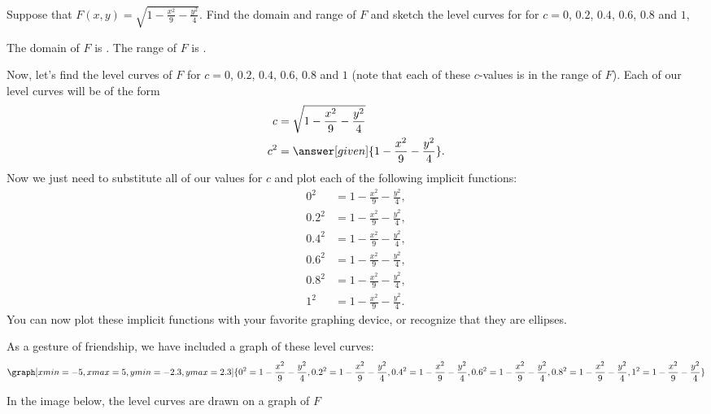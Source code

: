 \documentclass{ximera}
\begin{document}
\begin{example}
  Suppose that $F(x,y) = \sqrt{1-\frac{x^2}{9}-\frac{y^2}{4}}$.  Find
  the domain and range of $F$ and sketch the level curves for for
  $c=0$, $0.2$, $0.4$, $0.6$, $0.8$ and $1$,
  \begin{explanation}
    The domain of $F$ is
    . 
    The range of $F$ is
    \wordChoice{
      \choice{$\R$}
      \choice{$\R^2$}
      \choice{$[0,\infty)$}
      \choice[correct]{$[0,1]$}
      }.

      Now, let's find the level curves of $F$ for $c=0$, $0.2$, $0.4$,
      $0.6$, $0.8$ and $1$ (note that each of these $c$-values is in
      the range of $F$). Each of our level curves will be of the form
      \begin{align*}
        c &= \sqrt{1-\frac{x^2}{9}-\frac{y^2}{4}}\\
        c^2 &= \answer[given]{1-\frac{x^2}{9}-\frac{y^2}{4}}.
      \end{align*}
      Now we just need to substitute all of our values for $c$ and
      plot each of the following implicit functions:
    \begin{align*}
      0^2   &= 1-\frac{x^2}{9}-\frac{y^2}{4}, \\
      0.2^2 &= 1-\frac{x^2}{9}-\frac{y^2}{4}, \\
      0.4^2 &= 1-\frac{x^2}{9}-\frac{y^2}{4}, \\
      0.6^2 &= 1-\frac{x^2}{9}-\frac{y^2}{4}, \\
      0.8^2 &= 1-\frac{x^2}{9}-\frac{y^2}{4}, \\
        1^2 &= 1-\frac{x^2}{9}-\frac{y^2}{4}.   
    \end{align*}
    You can now plot these implicit functions with your favorite
    graphing device, or recognize that they are ellipses.
    \begin{onlineOnly}
      As a gesture of friendship, we have included a graph of these
      level curves:
      \[
      \graph[xmin=-5, xmax=5, ymin=-2.3, ymax=2.3]{0^2 = 1-\frac{x^2}{9}-\frac{y^2}{4}, 0.2^2 = 1-\frac{x^2}{9}-\frac{y^2}{4}, 0.4^2 = 1-\frac{x^2}{9}-\frac{y^2}{4},0.6^2 = 1-\frac{x^2}{9}-\frac{y^2}{4},0.8^2 = 1-\frac{x^2}{9}-\frac{y^2}{4},1^2 = 1-\frac{x^2}{9}-\frac{y^2}{4}}
      \]
    \end{onlineOnly}
    In the image below, the level curves are drawn on a graph of $F$

\end{explanation}
\end{example}
\end{document}
